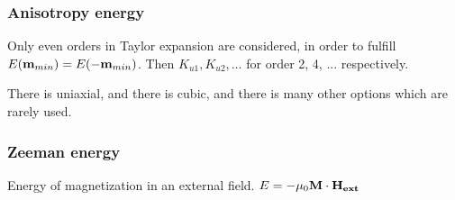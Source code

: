 \documentclass[10pt,a4paper]{article}
\begin{document}
	\subsubsection{Anisotropy energy}
	Only even orders in Taylor expansion are considered, in order to fulfill $E(\vb{m}_{min}) = E(-\vb{m}_{min})$. Then $K_{u1}, K_{u2}, \dots$ for order 2, 4, ... respectively.
	
	There is uniaxial, and there is cubic, and there is many other options which are rarely used.
	
	\subsubsection{Zeeman energy}
	Energy of magnetization in an external field.
	$E = -\mu_0 \vb{M} \cdot \vb{H_{ext}}$
	
	
	\newpage
	
	
\end{document}
